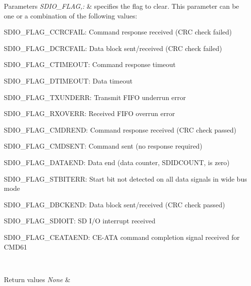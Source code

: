 \begin{DoxyParams}{Parameters}
{\em S\-D\-I\-O\-\_\-\-F\-L\-A\-G,\-:} & specifies the flag to clear. This parameter can be one or a combination of the following values\-: \begin{DoxyItemize}
\item S\-D\-I\-O\-\_\-\-F\-L\-A\-G\-\_\-\-C\-C\-R\-C\-F\-A\-I\-L\-: Command response received (C\-R\-C check failed) \item S\-D\-I\-O\-\_\-\-F\-L\-A\-G\-\_\-\-D\-C\-R\-C\-F\-A\-I\-L\-: Data block sent/received (C\-R\-C check failed) \item S\-D\-I\-O\-\_\-\-F\-L\-A\-G\-\_\-\-C\-T\-I\-M\-E\-O\-U\-T\-: Command response timeout \item S\-D\-I\-O\-\_\-\-F\-L\-A\-G\-\_\-\-D\-T\-I\-M\-E\-O\-U\-T\-: Data timeout \item S\-D\-I\-O\-\_\-\-F\-L\-A\-G\-\_\-\-T\-X\-U\-N\-D\-E\-R\-R\-: Transmit F\-I\-F\-O underrun error \item S\-D\-I\-O\-\_\-\-F\-L\-A\-G\-\_\-\-R\-X\-O\-V\-E\-R\-R\-: Received F\-I\-F\-O overrun error \item S\-D\-I\-O\-\_\-\-F\-L\-A\-G\-\_\-\-C\-M\-D\-R\-E\-N\-D\-: Command response received (C\-R\-C check passed) \item S\-D\-I\-O\-\_\-\-F\-L\-A\-G\-\_\-\-C\-M\-D\-S\-E\-N\-T\-: Command sent (no response required) \item S\-D\-I\-O\-\_\-\-F\-L\-A\-G\-\_\-\-D\-A\-T\-A\-E\-N\-D\-: Data end (data counter, S\-D\-I\-D\-C\-O\-U\-N\-T, is zero) \item S\-D\-I\-O\-\_\-\-F\-L\-A\-G\-\_\-\-S\-T\-B\-I\-T\-E\-R\-R\-: Start bit not detected on all data signals in wide bus mode \item S\-D\-I\-O\-\_\-\-F\-L\-A\-G\-\_\-\-D\-B\-C\-K\-E\-N\-D\-: Data block sent/received (C\-R\-C check passed) \item S\-D\-I\-O\-\_\-\-F\-L\-A\-G\-\_\-\-S\-D\-I\-O\-I\-T\-: S\-D I/\-O interrupt received \item S\-D\-I\-O\-\_\-\-F\-L\-A\-G\-\_\-\-C\-E\-A\-T\-A\-E\-N\-D\-: C\-E-\/\-A\-T\-A command completion signal received for C\-M\-D61 \end{DoxyItemize}
\\
\hline
\end{DoxyParams}

\begin{DoxyRetVals}{Return values}
{\em None} & \\
\hline
\end{DoxyRetVals}


